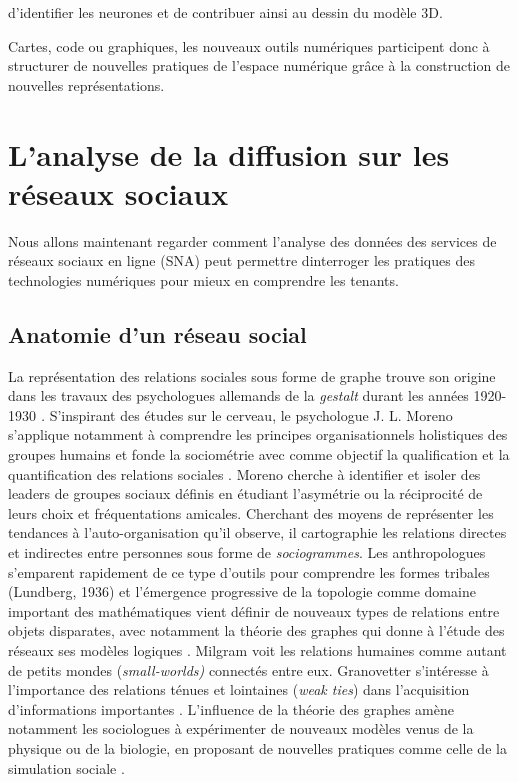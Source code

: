 d{\textquoteright}identifier les neurones et de contribuer ainsi au dessin du modèle 3D.

Cartes, code ou graphiques, les nouveaux outils numériques participent donc à structurer de nouvelles pratiques de l{\textquoteright}espace numérique gr\^ace à la construction de nouvelles représentations. 

\section[L{\textquoteright}analyse de la diffusion sur les réseaux sociaux]{L{\textquoteright}analyse de la diffusion sur les réseaux sociaux}

Nous allons maintenant regarder comment l{\textquoteright}analyse des données des services de réseaux sociaux en ligne (SNA) peut permettre d{\textquotesingle}interroger les pratiques des technologies numériques pour mieux en comprendre les tenants. 


\subsection[Anatomie d{\textquoteright}un réseau social]{ Anatomie d{\textquoteright}un réseau social}

La représentation des relations sociales sous forme de graphe trouve son origine dans les travaux des psychologues allemands de la \textit{gestalt }durant les années 1920-1930 \citep{Scott1988}\textit{. }S{\textquoteright}inspirant des études sur le cerveau, le psychologue J. L. Moreno s{\textquoteright}applique notamment à comprendre les principes organisationnels holistiques des groupes humains et fonde la sociométrie avec comme objectif la qualification et la quantification des relations sociales \citep{Moreno1938}. Moreno cherche à identifier et isoler des leaders de groupes sociaux définis en étudiant l{\textquoteright}asymétrie ou la réciprocité de leurs choix et fréquentations amicales. Cherchant des moyens de représenter les tendances à l{\textquoteright}auto-organisation qu{\textquoteright}il observe, il cartographie les relations directes et indirectes entre personnes sous forme de \textit{sociogrammes}. Les anthropologues s{\textquoteright}emparent rapidement de ce type d{\textquoteright}outils pour comprendre les formes tribales (Lundberg, 1936) et l{\textquoteright}émergence progressive de la topologie comme domaine important des mathématiques vient définir de nouveaux types de relations entre objets disparates, avec notamment la théorie des graphes qui donne à l{\textquoteright}étude des réseaux ses modèles logiques \citep{Harary1977}. Milgram \citep{Travers1969} voit les relations humaines comme autant de petits mondes (\textit{small-worlds)} connectés entre eux. Granovetter s{\textquoteright}intéresse à l{\textquoteright}importance des relations ténues et lointaines (\textit{weak ties}) dans l{\textquoteright}acquisition d{\textquoteright}informations importantes \citep{Granovetter1973}. L{\textquoteright}influence de la théorie des graphes amène notamment les sociologues à expérimenter de nouveaux modèles venus de la physique ou de la biologie, en proposant de nouvelles pratiques comme celle de la simulation sociale \citep{Epstein1996}. 


